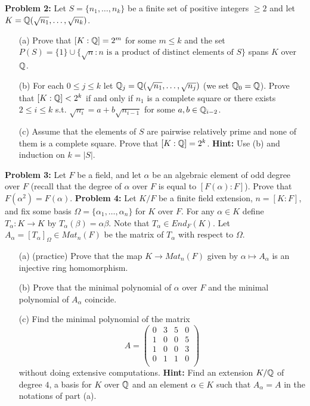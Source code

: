 \documentclass[12pt]{amsart}
\begin{document}
{\bf Problem 2:} \rm Let $S=\{n_1,\ldots, n_k\}$ be a finite set of positive integers $\geq 2$
and let $K={\mathbb Q}(\sqrt{n_1},\ldots, \sqrt{n_k})$.
\begin{itemize}
\item[(a)] Prove that $[K:{\mathbb Q}]=2^m$ for some $m\leq k$ and the set $P(S)=\{1\}\cup \{\sqrt{n} : n \mbox{ is a product of distinct elements of }S\}$ spans $K$ over ${\mathbb Q}$.

\item[(b)] For each $0\leq j\leq k$ let ${\mathbb Q}_j={\mathbb Q}(\sqrt{n_1},\ldots, \sqrt{n_j})$ (we set ${\mathbb Q}_0={\mathbb Q}$).
Prove that $[K:{\mathbb Q}]<2^k$ if and only if $n_1$ is a complete square or
there exists $2\leq i\leq k$ s.t. $\sqrt{n_i}=a+b\sqrt{n_{i-1}}$ for some $a,b\in{\mathbb Q}_{i-2}$.

\item[(c)] Assume that the elements of $S$ are pairwise relatively prime
and none of them is a complete square.
Prove that $[K:{\mathbb Q}]=2^k$. {\bf Hint:} Use (b) and induction on $k=|S|$.
\end{itemize}

{\bf Problem 3:} \rm Let $F$ be a field, and let $\alpha$ be an algebraic element of odd degree
over $F$ (recall that the degree of $\alpha$ over $F$ is equal to $[F(\alpha):F]$). Prove that
$F(\alpha^2)=F(\alpha)$.
\skv
\skv
{\bf Problem 4:} Let $K/F$ be a finite field extension, $n=[K:F]$, and fix some basis
$\Omega=\{\alpha_1,\ldots, \alpha_n\}$
for $K$ over $F$. For any $\alpha\in K$
define $T_{\alpha}:K\to K$ by $T_{\alpha}(\beta)=\alpha\beta$. Note that $T_{\alpha}\in  End_F(K)$.
Let $A_{\alpha}=[T_{\alpha}]_{\Omega}\in Mat_n(F)$ be the matrix of $T_{\alpha}$ with respect to $\Omega$.
\begin{itemize}


\item[(a)] (practice) Prove that the map $K\to Mat_n(F)$ given by $\alpha\mapsto A_{\alpha}$ is an injective ring homomorphism.
\item[(b)] Prove that the minimal polynomial of $\alpha$ over $F$ and the minimal polynomial of $A_{\alpha}$
coincide.

\item[(c)] Find the minimal polynomial of the matrix
$$A=\begin{pmatrix}  0&3& 5&0\\
1&0& 0&5\\
1&0& 0&3\\
0&1& 1&0\\
\end{pmatrix}$$
without doing extensive computations.
{\bf Hint:} Find an extension $K/{\mathbb Q}$ of degree $4$, a basis for $K$ over ${\mathbb Q}$
and an element $\alpha\in K$ such that $A_{\alpha}=A$ in the notations of part (a).
\end{itemize}
\end{document}
